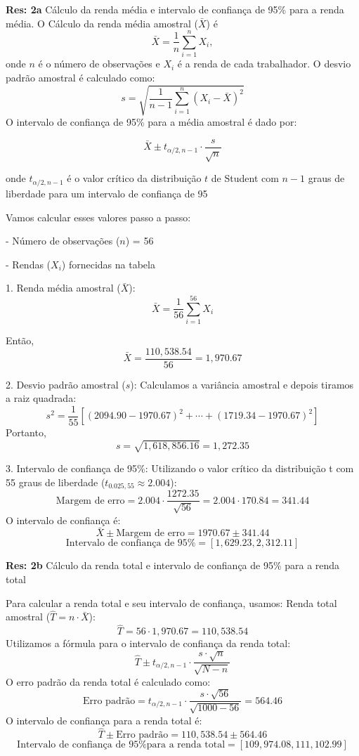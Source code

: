 \documentclass[a4paper,12pt,oneside,twocolumn]{Config/milktest}
\begin{document}
{\scriptsize

{\bf Res: 2a} Cálculo da renda média e intervalo de confiança de 95\% para a renda média. O Cálculo da renda média amostral (\(\bar{X}\)) é 
   \[
   \bar{X} = \frac{1}{n} \sum_{i=1}^{n} X_i,
   \]
   onde \(n\) é o número de observações e \(X_i\) é a renda de cada trabalhador.   O desvio padrão amostral é calculado como:
   \[
   s = \sqrt{\frac{1}{n-1} \sum_{i=1}^{n} (X_i - \bar{X})^2}
   \]
   O intervalo de confiança de 95\% para a média amostral é dado por:

   \[
   \bar{X} \pm t_{\alpha/2, n-1} \cdot \frac{s}{\sqrt{n}}
   \]

   onde \(t_{\alpha/2, n-1}\) é o valor crítico da distribuição $t$ de Student com \(n-1\) graus de liberdade para um intervalo de confiança de 95%

Vamos calcular esses valores passo a passo:

- Número de observações (\(n\)) = 56

- Rendas (\(X_i\)) fornecidas na tabela


1. Renda média amostral (\(\bar{X}\)):
\[
   \bar{X} = \frac{1}{56} \sum_{i=1}^{56} X_i
   \]


   Então,
   \[
   \bar{X} = \frac{110,538.54}{56} = 1,970.67
   \]

2. Desvio padrão amostral (\(s\)): Calculamos a variância amostral e depois tiramos a raiz quadrada:
\[
   s^2 = \frac{1}{55} \left[ (2094.90 - 1970.67)^2 + \cdots + (1719.34 - 1970.67)^2 \right] 
   \] Portanto,
   \[
   s = \sqrt{1,618,856.16} = 1,272.35
   \]

3. Intervalo de confiança de 95\%: Utilizando o valor crítico da distribuição t com 55 graus de liberdade (\(t_{0.025, 55} \approx 2.004\)): 
\[
   \text{Margem de erro} = 2.004 \cdot \frac{1272.35}{\sqrt{56}} = 2.004 \cdot 170.84 = 341.44
   \]
   O intervalo de confiança é: 
   \[
   \bar{X} \pm \text{Margem de erro} = 1970.67 \pm 341.44
   \] 
   \[
   \text{Intervalo de confiança de 95\%} = [1,629.23, 2,312.11]
   \]

{\bf Res: 2b} Cálculo da renda total e intervalo de confiança de 95\% para a renda total

Para calcular a renda total e seu intervalo de confiança, usamos: 
Renda total amostral (\(\hat{T} = n \cdot \bar{X}\)): 
\[
   \hat{T} = 56 \cdot 1,970.67 = 110,538.54
   \] 
   Utilizamos a fórmula para o intervalo de confiança da renda total:
   \[
   \hat{T} \pm t_{\alpha/2, n-1} \cdot \frac{s \cdot \sqrt{n}}{\sqrt{N - n}}
   \]
   O erro padrão da renda total é calculado como: 
   \[
   \text{Erro padrão} = t_{\alpha/2, n-1} \cdot \frac{s \cdot \sqrt{56}}{\sqrt{1000 - 56}}  = 564.46
   \] 
   O intervalo de confiança para a renda total é: 
   \[
   \hat{T} \pm \text{Erro padrão} = 110,538.54 \pm 564.46
   \]
   \[
   \text{Intervalo de confiança de 95\% para a renda total} = [109,974.08, 111,102.99]
   \]
}
\end{document}
